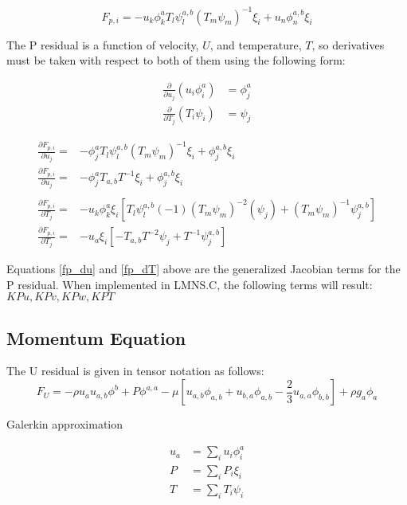 \begin{equation}
    F_{p,i} = -u_k \phi_k^a T_l \psi_l^{a,b} (T_m \psi_m)^{-1} \xi_i + u_n \phi_n^{a,b} \xi_i
\end{equation}

The P residual is a function of velocity, $U$, and temperature, $T$, so derivatives must be taken with respect to both of them using the following form:

\begin{align*}
    \frac{\partial}{\partial u_j} (u_i \phi_i^a) &= \phi_j^a \\
    \frac{\partial}{\partial T_j} (T_i \psi_i) &= \psi_j
\end{align*}

\begin{align}
    \frac{\partial F_{p,i}}{\partial u_j} = &-\phi_j^{a} T_l \psi_l^{a,b} (T_m \psi_m)^{-1} \xi_i + \phi_j^{a,b} \xi_i \nonumber \\
    \frac{\partial F_{p,i}}{\partial u_j} = &-\phi_j^{a} T_{a,b} T^{-1} \xi_i + \phi_j^{a,b} \xi_i \label {fp_du}\\ 
    \nonumber \\
    \frac{\partial F_{p,i}}{\partial T_j} = &-u_k \phi_k^a \xi_i \left [ T_l \psi_l^{a,b} (-1) (T_m \psi_m)^{-2} (\psi_j) + (T_m \psi_m)^{-1} \psi_j^{a,b} \right ] \nonumber \\
    \frac{\partial F_{p,i}}{\partial T_j} = &-u_a \xi_i \left [ -T_{a,b} T^{-2} \psi_j + T^{-1} \psi_j^{a,b} \right ] \label{fp_dT}
\end{align}

Equations \ref{fp_du} and \ref{fp_dT} above are the generalized Jacobian terms for the P residual. When implemented in LMNS.C, the following terms will result:\\
$KPu, KPv, KPw, KPT$

\newpage
\subsection{Momentum Equation}
The U residual is given in tensor notation as follows:
\begin{equation}
    F_U = -\rho u_a u_{a,b} \phi^b + P \phi^{a,a} - \mu \left [u_{a,b} \phi_{a,b} + u_{b,a} \phi_{a,b} - \frac{2}{3} u_{a,a} \phi_{b,b} \right ] + \rho g_a \phi_a
\end{equation}

Galerkin approximation

\begin{align*}
    u_a &= \sum_i u_i \phi_i^a\\
    P &= \sum_i P_i \xi_i\\
    T &= \sum_i T_i \psi_i
\end{align*}

